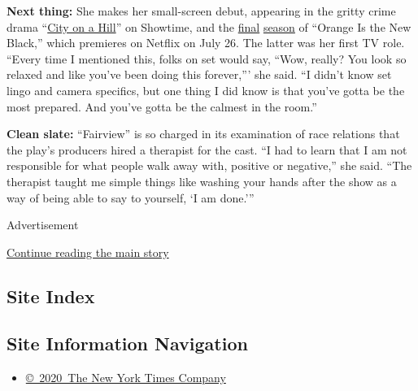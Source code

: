\textbf{Next thing:} She makes her small-screen debut, appearing in the
gritty crime drama ``\href{https://www.sho.com/city-on-a-hill}{City on a
Hill}'' on Showtime, and the
\href{https://twitter.com/OITNB/status/1143896745924947968}{final}
\href{https://twitter.com/OITNB/status/1143896745924947968}{season} of
``Orange Is the New Black,'' which premieres on Netflix on July 26. The
latter was her first TV role. ``Every time I mentioned this, folks on
set would say, ``Wow, really? You look so relaxed and like you've been
doing this forever,''' she said. ``I didn't know set lingo and camera
specifics, but one thing I did know is that you've gotta be the most
prepared. And you've gotta be the calmest in the room.''

\textbf{Clean slate:} ``Fairview'' is so charged in its examination of
race relations that the play's producers hired a therapist for the cast.
``I had to learn that I am not responsible for what people walk away
with, positive or negative,'' she said. ``The therapist taught me simple
things like washing your hands after the show as a way of being able to
say to yourself, `I am done.'''

Advertisement

\protect\hyperlink{after-bottom}{Continue reading the main story}

\hypertarget{site-index}{%
\subsection{Site Index}\label{site-index}}

\hypertarget{site-information-navigation}{%
\subsection{Site Information
Navigation}\label{site-information-navigation}}

\begin{itemize}
\tightlist
\item
  \href{https://help.nytimes.com/hc/en-us/articles/115014792127-Copyright-notice}{©~2020~The
  New York Times Company}
\end{itemize}


